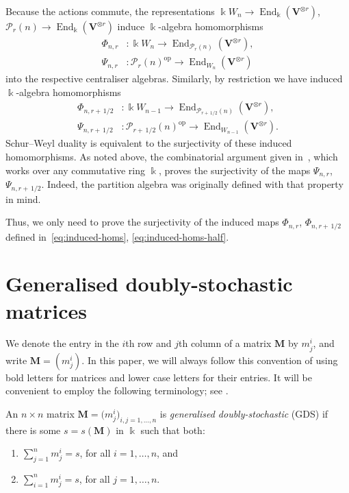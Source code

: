 \documentclass[ALCO,ThmDefs,Unicode,epreuves]{cedram}
\DeclareMathOperator{\End}{End}
\DeclareMathOperator{\op}{op}
\newcommand{\Ptn}{\mathcal{P}}
\newcommand{\bM}{\mathbf{M}}
\newcommand{\V}{\mathbf{V}} %
\newcommand{\half}{\, 1/2} %
\begin{document}
Because the actions commute, the representations $\Bbbk W_n
\to \End_\Bbbk(\V^{\otimes r})$, $\Ptn_r(n) \to \End_\Bbbk(\V^{\otimes
 r})$ induce $\Bbbk$-algebra homomorphisms
\begin{equation}\label{eq:induced-homs}
\begin{aligned}
 \Phi_{n,r}&: \Bbbk W_n \to \End_{\Ptn_r(n)}( \V^{\otimes r} ),\\
 \Psi_{n,r}&: \Ptn_r(n)^{\op} \to \End_{W_n}( \V^{\otimes r} )
\end{aligned}
\end{equation}
into the respective centraliser algebras. Similarly, by restriction we
have induced $\Bbbk$-algebra homomorphisms
\begin{equation}\label{eq:induced-homs-half}
\begin{aligned}
 \Phi_{n,r+\half}&: \Bbbk W_{n-1}
 \to \End_{\Ptn_{r+\half}(n)}(\V^{\otimes r} ), \\ \Psi_{n,r+\half}&:
 \Ptn_{r+\half}(n)^{\op} \to \End_{W_{n-1}}( \V^{\otimes r} ).
\end{aligned}
\end{equation}
Schur--Weyl duality is equivalent to the surjectivity of these induced
homomorphisms. As noted above, the combinatorial argument given in~\cite[Thm.~3.6]{HR-2005}, which works over any commutative ring
$\Bbbk$, proves the surjectivity of the maps $\Psi_{n,r}$,
$\Psi_{n,r+\half}$. Indeed, the partition algebra was originally
defined with that property in mind.

Thus, we only need to prove the surjectivity of the induced maps
$\Phi_{n,r}$, $\Phi_{n,r+\half}$ defined in~\eqref{eq:induced-homs}, \eqref{eq:induced-homs-half}.



\section{Generalised doubly-stochastic matrices}%
\label{sec:GDS}%
We denote the entry in the $i$th row and $j$th column of a matrix
$\bM$ by $m^i_j$, and write $\bM=(m^i_j)$. In this paper, we will
always follow this convention of using bold letters for matrices and
lower case letters for their entries. 
It will be convenient to employ the following terminology; see \eg \cite{Brualdi, Johnsen, Gibson, Lai}.

\begin{defi}\label{def:GDS}
 An $n \times n$ matrix $\bM = \big( m^i_j \big)_{i,j = 1, \dots, n}$
 is \emph{generalised doubly-stochastic} (GDS) if there is some $s =
 s(\bM)$ in $\Bbbk$ such that both:
 \begin{enumerate}[label=(\alph*)]
 \item $\sum_{j=1}^n m^i_j = s$, for all $i=1, \dots, n$, and
 \item $\sum_{i=1}^n m^i_j = s$, for all $j = 1, \dots, n$. 
 \end{enumerate}
\end{defi}
\end{document}
